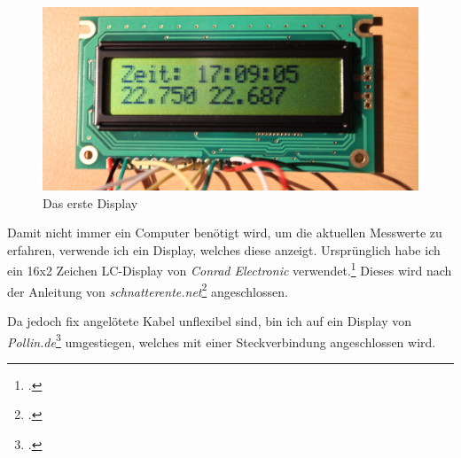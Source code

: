 \begin{figure}[h]
  \centering
     \includegraphics[width=\textwidth]{figures/erstes_display.jpg}
  \caption{Das erste Display}
  \label{fig:erstes_display}
\end{figure}

Damit nicht immer ein Computer benötigt wird, um die aktuellen Messwerte zu erfahren, verwende ich ein Display, welches diese anzeigt. Ursprünglich habe ich ein 16x2 Zeichen \gls{LC-Display} von \emph{Conrad Electronic} verwendet.\footcite{conrad_datenblatt}
Dieses wird nach der Anleitung von \emph{schnatterente.net}\footcite{schnatterente} angeschlossen.

Da jedoch fix angelötete Kabel unflexibel sind, bin ich auf ein Display von \emph{Pollin.de}\footcite{display_pollin} umgestiegen, welches mit einer Steckverbindung angeschlossen wird.

